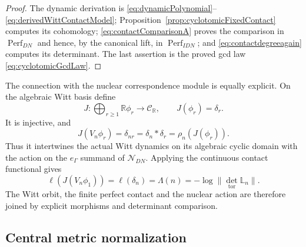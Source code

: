 \documentclass[11pt]{amsart}
\theoremstyle{definition}
\theoremstyle{remark}
\newcommand{\R}{\mathbb R}
\begin{document}
\begin{proof}
The dynamic derivation is
\eqref{eq:dynamicPolynomial}--\eqref{eq:derivedWittContactModel};
Proposition~\ref{prop:cyclotomicFixedContact} computes its cohomology;
\eqref{eq:contactComparisonA} proves the comparison in
$\operatorname{Perf}_{DN}$ and hence, by the canonical lift, in
$\operatorname{Perf}_{IDN}$; and \eqref{eq:contactdegreeagain} computes its
determinant.  The last assertion is the proved gcd law
\eqref{eq:cyclotomicGcdLaw}.
\end{proof}

The connection with the nuclear correspondence module is equally
explicit.  On the algebraic Witt basis define
\begin{equation}\label{eq:WittNuclearIntertwiner}
 J:\bigoplus_{r\geq1}\R\phi_r\longrightarrow\mathcal C_{\R},
 \qquad J(\phi_r)=\delta_r.
\end{equation}
It is injective, and
\begin{equation}\label{eq:WittNuclearIntertwining}
 J(V_n\phi_r)=\delta_{nr}=\delta_n*\delta_r
 =\rho_n(J(\phi_r)).
\end{equation}
Thus it intertwines the actual Witt dynamics on its algebraic cyclic domain
with the action on the $e_\Gamma$ summand of $\mathcal N_{DN}$.  Applying
the continuous contact functional gives
\begin{equation}\label{eq:nuclearContactComparison}
 \ell(J(V_n\phi_1))=\ell(\delta_n)=\Lambda(n)
 =-\log\|\det_{\mathrm{tor}}\mathbb L_n\|.
\end{equation}
The Witt orbit, the finite perfect contact and the nuclear action are
therefore joined by explicit morphisms and determinant comparison.

\subsection{Central metric normalization}
\end{document}
